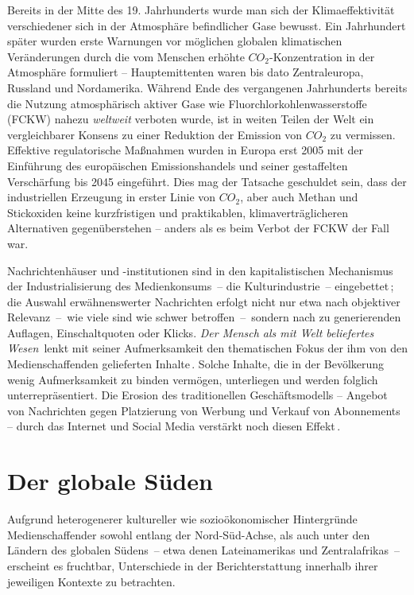 Bereits in der Mitte des 19. Jahrhunderts wurde man sich der Klimaeffektivität verschiedener sich in der Atmosphäre befindlicher Gase bewusst.
Ein Jahrhundert später wurden erste Warnungen vor möglichen globalen klimatischen Veränderungen durch die vom Menschen erhöhte \(CO_2\)-Konzentration in der Atmosphäre formuliert -- Hauptemittenten waren bis dato Zentraleuropa, Russland und Nordamerika.
Während Ende des vergangenen Jahrhunderts bereits die Nutzung atmosphärisch aktiver Gase wie Fluorchlorkohlenwasserstoffe (FCKW) nahezu \textit{weltweit} verboten wurde, ist in weiten Teilen der Welt ein vergleichbarer Konsens zu einer Reduktion der Emission von \(CO_2\) zu vermissen.
Effektive regulatorische Maßnahmen wurden in Europa erst 2005 mit der Einführung des europäischen Emissionshandels und seiner gestaffelten Verschärfung bis 2045 eingeführt.
Dies mag der Tatsache geschuldet sein, dass der industriellen Erzeugung in erster Linie von \(CO_2\), aber auch Methan und Stickoxiden keine kurzfristigen und praktikablen, klimaverträglicheren Alternativen gegenüberstehen -- anders als es beim Verbot der FCKW der Fall war.\par\medskip
%
Nachrichtenhäuser und -institutionen sind in den kapitalistischen Mechanismus der Industrialisierung des Medienkonsums~-- die Kulturindustrie~-- eingebettet\,\cite{Book.Horkheimer.Kulturindustrie.2024}; die Auswahl erwähnenswerter Nachrichten erfolgt nicht nur etwa nach objektiver Relevanz~--~wie viele sind wie schwer betroffen~--~sondern nach zu generierenden Auflagen, Einschaltquoten oder Klicks.
\textit{\glqq Der Mensch als mit Welt beliefertes Wesen\grqq}~lenkt mit seiner Aufmerksamkeit den thematischen Fokus der ihm von den Medienschaffenden gelieferten Inhalte\,\cite{InCollection.Anders.DieWeltAlsPhantomUndMatrize.2019}.
Solche Inhalte, die in der Bevölkerung wenig Aufmerksamkeit zu binden vermögen, unterliegen und werden folglich unterrepräsentiert.
Die Erosion des traditionellen Geschäftsmodells -- Angebot von Nachrichten gegen Platzierung von Werbung und Verkauf von Abonnements -- durch das Internet und Social Media verstärkt noch diesen Effekt\,\cite{Article.Schaefer.ClimateJournalismInAChangingMediaEcosystemAssessingTheProductionOfClimateChangerelatedNewsAroundTheWorld.2020}.

\section{Der globale Süden}

Aufgrund heterogenerer kultureller wie sozioökonomischer Hintergründe Medienschaffender sowohl entlang der Nord-Süd-Achse, als auch unter den Ländern des globalen Südens~-- etwa denen Lateinamerikas und Zentralafrikas~-- erscheint es fruchtbar, Unterschiede in der Berichterstattung innerhalb ihrer jeweiligen Kontexte zu betrachten.

